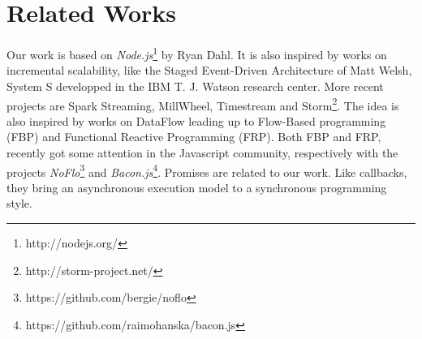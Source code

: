 \section{Related Works} \label{section:related}

Our work is based on \textit{Node.js}\footnote{\raggedright http://nodejs.org/} by Ryan Dahl.
It is also inspired by works on incremental scalability, like the Staged Event-Driven Architecture of Matt Welsh\cite{Welsh2000}, System S developped in the IBM T. J. Watson research center\cite{Jain2006}.
More recent projects are Spark Streaming\cite{Zaharia2012}, MillWheel\cite{Akidau2013}, Timestream\cite{Qian2013} and Storm\footnote{\raggedright http://storm-project.net/}.
The idea is also inspired by works on DataFlow leading up to Flow-Based programming (FBP)\cite{Morrison1994} and Functional Reactive Programming (FRP)\cite{Elliott1997}.
Both FBP and FRP, recently got some attention in the Javascript community, respectively with the projects \textit{NoFlo}\footnote{\raggedright https://github.com/bergie/noflo} and \textit{Bacon.js}\footnote{\raggedright https://github.com/raimohanska/bacon.js}.
Promises\cite{Liskov1988} are related to our work.
Like callbacks, they bring an asynchronous execution model to a synchronous programming style.